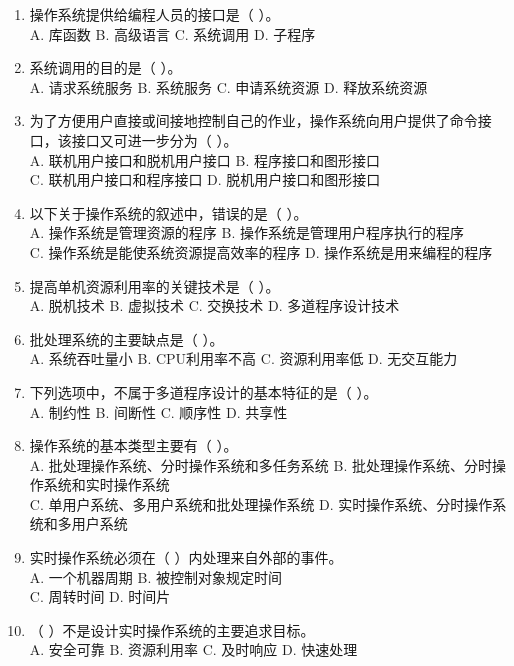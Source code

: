 \documentclass[lang=cn,newtx,10pt,scheme=chinese]{../../elegantbook}
\begin{document}
\begin{enumerate}
  \item 操作系统提供给编程人员的接口是（ ）。\\
  A. 库函数 \quad B. 高级语言 \quad C. 系统调用 \quad D. 子程序

  \item 系统调用的目的是（ ）。\\
  A. 请求系统服务 \quad B. 系统服务 \quad C. 申请系统资源 \quad D. 释放系统资源
  \item 为了方便用户直接或间接地控制自己的作业，操作系统向用户提供了命令接口，该接口又可进一步分为（ ）。\\
  A. 联机用户接口和脱机用户接口 \quad B. 程序接口和图形接口\\
  C. 联机用户接口和程序接口 \quad D. 脱机用户接口和图形接口

  \item 以下关于操作系统的叙述中，错误的是（ ）。\\
  A. 操作系统是管理资源的程序 \quad B. 操作系统是管理用户程序执行的程序\\
  C. 操作系统是能使系统资源提高效率的程序 \quad D. 操作系统是用来编程的程序

  \item 提高单机资源利用率的关键技术是（ ）。\\
  A. 脱机技术 \quad B. 虚拟技术 \quad C. 交换技术 \quad D. 多道程序设计技术

  \item 批处理系统的主要缺点是（ ）。\\
  A. 系统吞吐量小 \quad B. CPU利用率不高 \quad C. 资源利用率低 \quad D. 无交互能力

  \item 下列选项中，不属于多道程序设计的基本特征的是（ ）。\\
  A. 制约性 \quad B. 间断性 \quad C. 顺序性 \quad D. 共享性
  \item 操作系统的基本类型主要有（ ）。\\
  A. 批处理操作系统、分时操作系统和多任务系统 \quad 
  B. 批处理操作系统、分时操作系统和实时操作系统\\
  C. 单用户系统、多用户系统和批处理操作系统 \quad 
  D. 实时操作系统、分时操作系统和多用户系统

  \item 实时操作系统必须在（ ）内处理来自外部的事件。\\
  A. 一个机器周期 \quad B. 被控制对象规定时间\\
  C. 周转时间 \quad D. 时间片

  \item （ ）不是设计实时操作系统的主要追求目标。\\
  A. 安全可靠 \quad B. 资源利用率 \quad C. 及时响应 \quad D. 快速处理


\end{enumerate}
\end{document}
